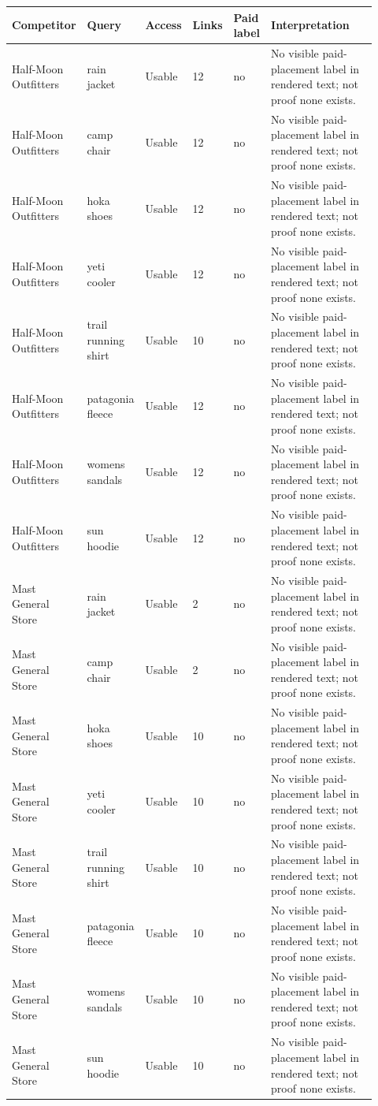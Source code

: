 \documentclass[10pt]{article}
\begin{document}
{\fontsize{6.55}{7.7}\selectfont
\setlength{\tabcolsep}{1.7pt}
\begin{longtable}{@{}L{0.15\linewidth}L{0.15\linewidth}R{0.08\linewidth}R{0.10\linewidth}R{0.10\linewidth}L{0.34\linewidth}@{}}
\toprule
\textbf{Competitor} & \textbf{Query} & \textbf{Access} & \textbf{Links} & \textbf{Paid label} & \textbf{Interpretation}\\
\midrule
\endhead
Half-Moon Outfitters & rain jacket & Usable & 12 & no & No visible paid-placement label in rendered text; not proof none exists.\\
Half-Moon Outfitters & camp chair & Usable & 12 & no & No visible paid-placement label in rendered text; not proof none exists.\\
Half-Moon Outfitters & hoka shoes & Usable & 12 & no & No visible paid-placement label in rendered text; not proof none exists.\\
Half-Moon Outfitters & yeti cooler & Usable & 12 & no & No visible paid-placement label in rendered text; not proof none exists.\\
Half-Moon Outfitters & trail running shirt & Usable & 10 & no & No visible paid-placement label in rendered text; not proof none exists.\\
Half-Moon Outfitters & patagonia fleece & Usable & 12 & no & No visible paid-placement label in rendered text; not proof none exists.\\
Half-Moon Outfitters & womens sandals & Usable & 12 & no & No visible paid-placement label in rendered text; not proof none exists.\\
Half-Moon Outfitters & sun hoodie & Usable & 12 & no & No visible paid-placement label in rendered text; not proof none exists.\\
Mast General Store & rain jacket & Usable & 2 & no & No visible paid-placement label in rendered text; not proof none exists.\\
Mast General Store & camp chair & Usable & 2 & no & No visible paid-placement label in rendered text; not proof none exists.\\
Mast General Store & hoka shoes & Usable & 10 & no & No visible paid-placement label in rendered text; not proof none exists.\\
Mast General Store & yeti cooler & Usable & 10 & no & No visible paid-placement label in rendered text; not proof none exists.\\
Mast General Store & trail running shirt & Usable & 10 & no & No visible paid-placement label in rendered text; not proof none exists.\\
Mast General Store & patagonia fleece & Usable & 10 & no & No visible paid-placement label in rendered text; not proof none exists.\\
Mast General Store & womens sandals & Usable & 10 & no & No visible paid-placement label in rendered text; not proof none exists.\\
Mast General Store & sun hoodie & Usable & 10 & no & No visible paid-placement label in rendered text; not proof none exists.\\
\bottomrule
\end{longtable}
}
\end{document}

